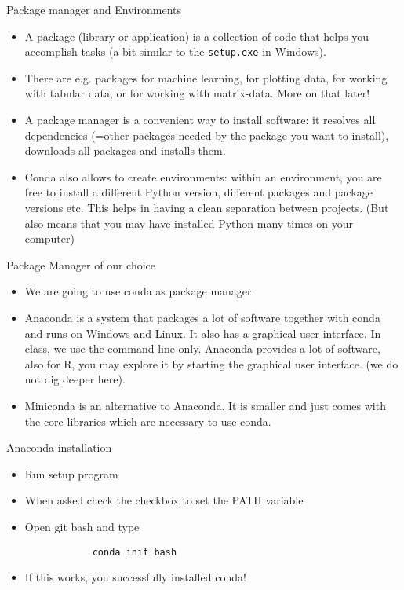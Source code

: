 \begin{frame}[fragile]{Package manager and Environments}
	\begin{itemize}
		\item A package (library or application) is a collection of code that helps you accomplish
            tasks (a bit similar to the \verb|setup.exe| in Windows).
		\item There are e.g. packages for machine learning, for plotting data, for working with tabular data, or for working with matrix-data. More on that later!
		\item A package manager is a convenient way to install software: it resolves all
            dependencies (=other packages needed by the package you want to install), downloads all packages and installs them.
		\item Conda also allows to create environments: within an environment, you are free to install a different Python version, different packages and package versions etc. This helps in having a clean separation between projects. (But also means that you may have installed Python many times on your computer)
	\end{itemize}

\end{frame}


\begin{frame}{Package Manager of our choice}

	\begin{itemize}
		\item We are going to use conda as package manager.
		\item Anaconda is a system that packages a lot of software together with conda and runs on Windows and Linux. It also has a graphical user interface. In class, we use the command line only. Anaconda provides a lot of software, also for R, you may explore it by starting the graphical user interface. (we do not dig deeper here).
		\item Miniconda is an alternative to Anaconda. It is smaller and just comes with the core libraries which are necessary to use conda.

	\end{itemize}


\end{frame}

\begin{frame}[fragile]{Anaconda installation}

		\begin{itemize}
		\item Run setup program
		\item When asked check the checkbox to set the PATH variable
		\item Open git bash and type

		\begin{verbatim}
			conda init bash
		\end{verbatim}
		\item If this works, you successfully installed conda!

		\end{itemize}

\end{frame}

